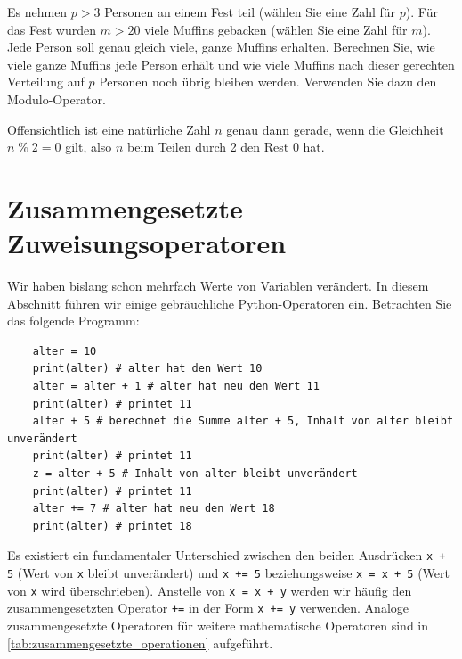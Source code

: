\begin{myexercise}\label{ex:modulo_muffin}
	Es nehmen $p>3$ Personen an einem Fest teil (wählen Sie eine Zahl für $p$). Für das Fest wurden $m > 20$ viele Muffins gebacken (wählen Sie eine Zahl für $m$). Jede Person soll genau gleich viele, ganze Muffins erhalten. Berechnen Sie, wie viele ganze Muffins jede Person erhält und wie viele Muffins nach dieser gerechten Verteilung auf $p$ Personen noch übrig bleiben werden. Verwenden Sie dazu den Modulo-Operator.
	\begin{myanswer}
		
	\end{myanswer}
\end{myexercise}

\begin{myexample}
Offensichtlich ist eine natürliche Zahl $n$ genau dann gerade, wenn die Gleichheit $n \;\%\; 2 = 0$ gilt, also $n$ beim Teilen durch 2 den Rest 0 hat.
\end{myexample}


\section{Zusammengesetzte Zuweisungsoperatoren}
Wir haben bislang schon mehrfach Werte von Variablen verändert. In diesem Abschnitt führen wir einige gebräuchliche Python-Operatoren ein. Betrachten Sie das folgende Programm:
\begin{lstlisting}
	alter = 10
	print(alter) # alter hat den Wert 10
	alter = alter + 1 # alter hat neu den Wert 11 
	print(alter) # printet 11
	alter + 5 # berechnet die Summe alter + 5, Inhalt von alter bleibt unverändert
	print(alter) # printet 11
	z = alter + 5 # Inhalt von alter bleibt unverändert 
	print(alter) # printet 11
	alter += 7 # alter hat neu den Wert 18
	print(alter) # printet 18 
\end{lstlisting}
Es existiert ein fundamentaler Unterschied zwischen den beiden Ausdrücken \lstinline|x + 5| (Wert von \lstinline|x| bleibt unverändert) und \lstinline|x += 5| beziehungsweise \lstinline|x = x + 5| (Wert von \lstinline|x| wird überschrieben). Anstelle von \lstinline|x = x + y| werden wir häufig den zusammengesetzten Operator \lstinline|+=| in der Form \lstinline|x += y| verwenden. Analoge zusammengesetzte Operatoren für weitere mathematische Operatoren sind in \cref{tab:zusammengesetzte_operationen} aufgeführt.

